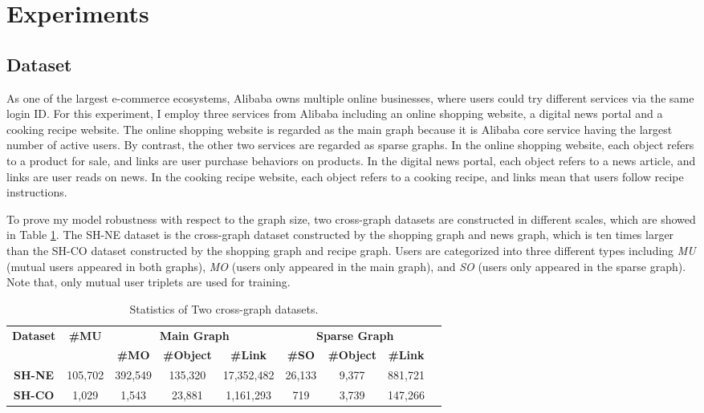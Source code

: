 \section{Experiments}  \label{sc:exp}
\subsection{Dataset}  \label{sc:dataset}
As one of the largest e-commerce ecosystems, Alibaba owns multiple online businesses, where users could try different services via the same login ID. For this experiment, I employ three services from Alibaba including an online shopping website, a digital news portal and a cooking recipe website. The online shopping website is regarded as the main graph because it is Alibaba core service having the largest number of active users. By contrast, the other two services are regarded as sparse graphs. In the online shopping website, each object refers to a product for sale, and links are user purchase behaviors on products. In the digital news portal, each object refers to a news article, and links are user reads on news. In the cooking recipe website, each object refers to a cooking recipe, and links mean that users follow recipe instructions. 

To prove my model robustness with respect to the graph size, two cross-graph datasets are constructed in different scales, which are showed in Table \ref{tab:dataset}. The SH-NE dataset is the cross-graph dataset constructed by the shopping graph and news graph, which is ten times larger than the SH-CO dataset constructed by the shopping graph and recipe graph. Users are categorized into three different types including \textit{MU} (mutual users appeared in both graphs),  \textit{MO} (users only appeared in the main graph), and  \textit{SO} (users only appeared in the sparse graph). Note that, only mutual user triplets are used for training.

\begin{table}[h]
	
	\centering
	\begin{tabular}{|c|c|c|c|c|c|c|c|c|} 
		\hline
		\multirow{2}{*}{\textbf{Dataset}}& \multirow{2}{*}{\textbf{\#MU}}&\multicolumn{3}{c|}{\textbf{Main Graph}}& \multicolumn{3}{c|}{\textbf{Sparse Graph}}\\ \cline{3-8}
		&  &\textbf{\#MO}&\textbf{\#Object}& \textbf{\#Link}&\textbf{\#SO}&\textbf{\#Object}& \textbf{\#Link}\\ \hline
		\textbf{SH-NE}& 105,702 & 392,549 & 135,320 & 17,352,482  & 26,133 & 9,377 & 881,721\\ 
		\textbf{SH-CO}& 1,029  & 1,543  &23,881 & 1,161,293& 719  & 3,739 &147,266\\\hline
	\end{tabular}
	\caption{Statistics of Two cross-graph datasets.}
	\label{tab:dataset}
\end{table}  

